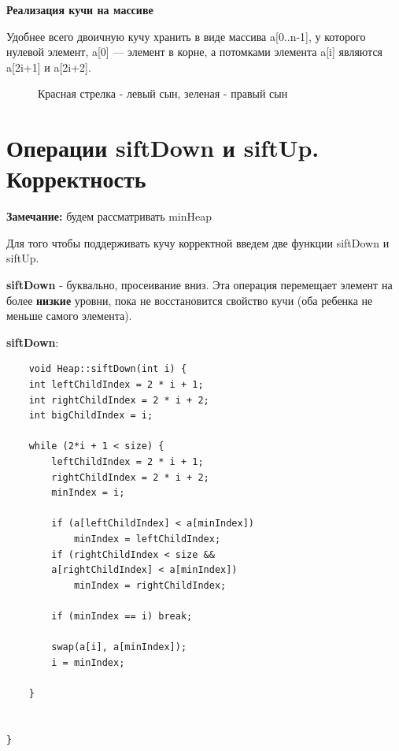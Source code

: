 \textbf{Реализация кучи на массиве}

Удобнее всего двоичную кучу хранить в виде массива a[0..n-1], у которого нулевой элемент, a[0] — элемент в корне, а потомками элемента a[i] являются a[2i+1] и a[2i+2].
 \begin{figure}[h]
\caption {Красная стрелка - левый сын, зеленая - правый сын}
\label{ris:image}
\end{figure}

\section{Операции siftDown и siftUp. Корректность}
\textbf{Замечание:} будем рассматривать minHeap

Для того чтобы поддерживать кучу корректной введем две функции siftDown и siftUp.

\textbf{siftDown} - буквально, просеивание вниз. Эта операция перемещает элемент на более \textbf{низкие} уровни, пока не восстановится свойство кучи (оба ребенка не меньше самого элемента).

\textbf{siftDown}:

 \begin{lstlisting}
    void Heap::siftDown(int i) {
    int leftChildIndex = 2 * i + 1;
    int rightChildIndex = 2 * i + 2;
    int bigChildIndex = i;

    while (2*i + 1 < size) {
        leftChildIndex = 2 * i + 1;
        rightChildIndex = 2 * i + 2;
        minIndex = i;
        
        if (a[leftChildIndex] < a[minIndex])
            minIndex = leftChildIndex;
        if (rightChildIndex < size &&
        a[rightChildIndex] < a[minIndex])
            minIndex = rightChildIndex;

        if (minIndex == i) break;

        swap(a[i], a[minIndex]);
        i = minIndex;

    }


}
\end{lstlisting}

